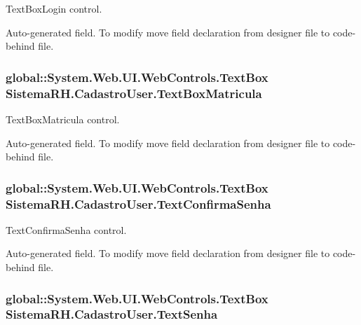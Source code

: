 TextBoxLogin control. 

Auto-\/generated field. To modify move field declaration from designer file to code-\/behind file. \hypertarget{class_sistema_r_h_1_1_cadastro_user_a1b31ea83fdaa5e27197df523cf89da85}{
\subsubsection[{TextBoxMatricula}]{\setlength{\rightskip}{0pt plus 5cm}global::System.Web.UI.WebControls.TextBox {\bf SistemaRH.CadastroUser.TextBoxMatricula}}}
\label{class_sistema_r_h_1_1_cadastro_user_a1b31ea83fdaa5e27197df523cf89da85}


TextBoxMatricula control. 

Auto-\/generated field. To modify move field declaration from designer file to code-\/behind file. \hypertarget{class_sistema_r_h_1_1_cadastro_user_a229680f0d1904176b3326e112b2e08b4}{
\subsubsection[{TextConfirmaSenha}]{\setlength{\rightskip}{0pt plus 5cm}global::System.Web.UI.WebControls.TextBox {\bf SistemaRH.CadastroUser.TextConfirmaSenha}}}
\label{class_sistema_r_h_1_1_cadastro_user_a229680f0d1904176b3326e112b2e08b4}


TextConfirmaSenha control. 

Auto-\/generated field. To modify move field declaration from designer file to code-\/behind file. \hypertarget{class_sistema_r_h_1_1_cadastro_user_a14b49b07f7bd5643d72c04cd3edc3f4b}{
\subsubsection[{TextSenha}]{\setlength{\rightskip}{0pt plus 5cm}global::System.Web.UI.WebControls.TextBox {\bf SistemaRH.CadastroUser.TextSenha}}}
\label{class_sistema_r_h_1_1_cadastro_user_a14b49b07f7bd5643d72c04cd3edc3f4b}


